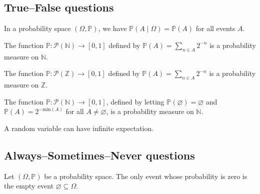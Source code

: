 
\subsection*{True--False questions}


\begin{chapex} %
\label{cqProbabilityTFBegin}
In a probability space $(\Omega, \mathbb{P})$, we have $\mathbb{P}(A \mid \Omega) = \mathbb{P}(A)$ for all events $A$.
\end{chapex}

\begin{chapex} %
The function $\mathbb{P} : \mathcal{P}(\mathbb{N}) \to [0,1]$ defined by $\mathbb{P}(A) = \sum_{n \in A} 2^{-n}$ is a probability measure on $\mathbb{N}$.
\end{chapex}

\begin{chapex} %
The function $\mathbb{P} : \mathcal{P}(\mathbb{Z}) \to [0,1]$ defined by $\mathbb{P}(A) = \sum_{n \in A} 2^{-n}$ is a probability measure on $\mathbb{Z}$.
\end{chapex}

\begin{chapex} %
The function $\mathbb{P} : \mathcal{P}(\mathbb{N}) \to [0,1]$, defined by letting $\mathbb{P}(\varnothing) = \varnothing$ and $\mathbb{P}(A) = 2^{-\mathrm{min}(A)}$ for all $A \ne \varnothing$, is a probability measure on $\mathbb{N}$.
\end{chapex}

\begin{chapex} %
\label{cqProbabilityTFEnd}
A random variable can have infinite expectation.
\end{chapex}

\subsection*{Always--Sometimes--Never questions}


\begin{chapex} %
\label{cqProbabilityASNBegin}
Let $(\Omega, \mathbb{P})$ be a probability space. The only event whose probability is zero is the empty event $\varnothing \subseteq \Omega$.
\end{chapex}

